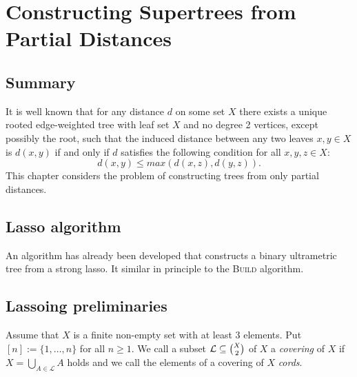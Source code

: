 \chapter{Constructing Supertrees from Partial Distances}
\label{cha:constr-ultr-supertr}

\section{Summary}
\label{sec:con-summary}

It is well known that for any distance $d$ on some set $X$ there exists a
unique rooted edge-weighted tree with leaf set $X$ and no degree 2 vertices,
except possibly the root, such that the induced distance between any two
leaves $x,y \in X$ is $d(x,y)$ if and only if $d$ satisfies the following
condition for all $x,y,z \in X$:
\begin{equation}
  \label{eq:ultrametric}
  d(x,y) \leq max(d(x,z),d(y,z)).
\end{equation}
This chapter considers the problem of constructing trees from only partial
distances.

\section{Lasso algorithm}
\label{sec:lasso-algorithm}

An algorithm has already been developed that constructs a binary ultrametric
tree from a strong lasso.  It similar in principle to the \textsc{Build}
algorithm.

\section{Lassoing preliminaries}
\label{sec:lass-prelim}

Assume that $X$ is a finite non-empty set with at least 3 elements.  Put
$[n]:=\{1,\ldots, n\}$ for all $n\geq 1$.  We call a subset ${\mathcal L}\subseteq
{X\choose 2}$ of $X$ a {\em covering} of $X$ if $X=\bigcup_{A\in \mathcal L}A$
holds and we call the elements of a covering of $X$ {\em cords}.


